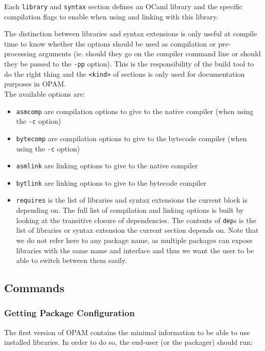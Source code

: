 \documentclass[a4paper,11pt]{article}
\begin{document}
Each {\tt library} and {\tt syntax} section defines an OCaml library
and the specific compilation flags to enable when using and linking
with this library.

The distinction between libraries and syntax extensions is only useful
at compile time to know whether the options should be used as
compilation or pre-processing arguments (ie. should they go on the
compiler command line or should they be passed to the {\tt -pp}
option). This is the responsibility of the build tool to do the right
thing and the {\tt <kind>} of sections is only used for documentation
purposes in OPAM. \\

The available options are:

\begin{itemize}
\item {\tt asmcomp} are compilation options to give to the native
  compiler (when using the {\tt -c} option)
\item {\tt bytecomp} are compilation options to give to the bytecode
  compiler (when using the {\tt -c} option)
\item {\tt asmlink} are linking options to give to the native compiler
\item {\tt bytlink} are linking options to give to the bytecode
  compiler
\item {\tt requires} is the list of libraries and syntax extensions
  the current block is depending on. The full list of compilation
  and linking options is built by looking at the transitive closure of
  dependencies. The contents of {\tt dep}s is the list of libraries or
  syntax extension the current section depends on. Note that we do not
  refer here to any package name, as multiple packages can expose libraries
  with the same name and interface and thus we want the user to be able
  to switch between them easily.
\end{itemize}

\subsection{Commands}

\subsubsection{Getting Package Configuration}

The first version of OPAM contains the minimal information to be able
to use installed libraries. In order to do so, the end-user (or the
packager) should run:
\end{document}
